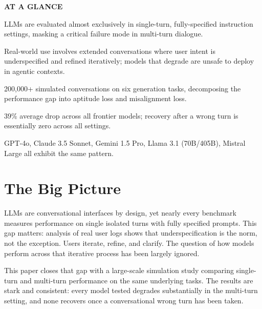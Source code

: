 \documentclass[10pt,twocolumn]{article}
\begin{document}
\begin{mdframed}[backgroundcolor=boxgray,linecolor=rulered,linewidth=1pt,
    innerleftmargin=6pt,innerrightmargin=6pt,
    innertopmargin=6pt,innerbottommargin=6pt]
\textbf{\small AT A GLANCE}\par\vspace{4pt}
\begin{description}[leftmargin=0pt,labelsep=4pt,itemsep=2pt,parsep=0pt,
    font=\small\bfseries]
  \item[Problem:] LLMs are evaluated almost exclusively in single-turn,
    fully-specified instruction settings, masking a critical failure mode in
    multi-turn dialogue.
  \item[Why it matters:] Real-world use involves extended conversations where
    user intent is underspecified and refined iteratively; models that degrade
    are unsafe to deploy in agentic contexts.
  \item[Method:] 200,000+ simulated conversations on six generation tasks,
    decomposing the performance gap into aptitude loss and misalignment loss.
  \item[Result:] 39\% average drop across all frontier models; recovery after a
    wrong turn is essentially zero across all settings.
  \item[Evidence:] GPT-4o, Claude 3.5 Sonnet, Gemini 1.5 Pro, Llama 3.1
    (70B/405B), Mistral Large all exhibit the same pattern.
\end{description}
\end{mdframed}

\section{The Big Picture}

LLMs are conversational interfaces by design, yet nearly every benchmark
measures performance on single isolated turns with fully specified prompts.
This gap matters: analysis of real user logs shows that underspecification is
the norm, not the exception. Users iterate, refine, and clarify. The question
of how models perform across that iterative process has been largely ignored.

This paper closes that gap with a large-scale simulation study comparing
single-turn and multi-turn performance on the same underlying tasks. The
results are stark and consistent: every model tested degrades substantially
in the multi-turn setting, and none recovers once a conversational wrong
turn has been taken.
\end{document}

